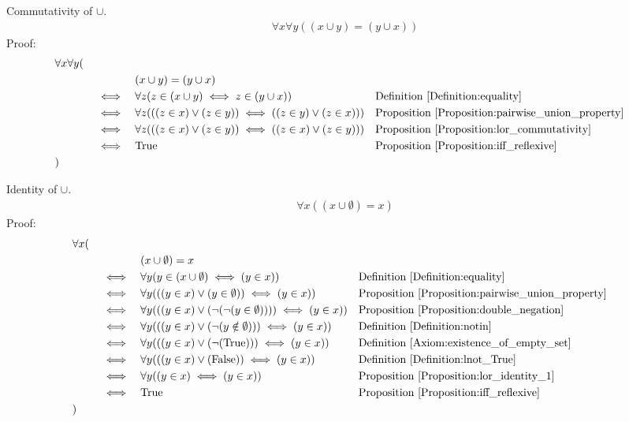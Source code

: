 \begin{prop}
\label{Proposition:union_commutativity}
Commutativity of $\cup$.
\begin{align*}
\forall x \forall y ((x \cup y) = (y \cup x))
\end{align*}
Proof:
\begin{align*}
& \forall x \forall y ( \\
& \quad && && (x \cup y) = (y \cup x) \\
& \quad && \iff && \forall z (z \in (x \cup y) \iff z \in (y \cup x))
&& \text{Definition \ref{Definition:equality}} \\
& \quad && \iff && \forall z( ((z \in x) \lor (z \in y)) \iff ((z \in y) \lor (z \in x)) )
&& \text{Proposition \ref{Proposition:pairwise_union_property}} \\
& \quad && \iff && \forall z( ((z \in x) \lor (z \in y)) \iff ((z \in x) \lor (z \in y)) )
&& \text{Proposition \ref{Proposition:lor_commutativity}} \\
& \quad && \iff && \text{True}
&& \text{Proposition \ref{Proposition:iff_reflexive}} \\
& )
\end{align*}
\end{prop}

\begin{prop}
\label{Proposition:union_identity}
Identity of $\cup$.
\begin{align*}
\forall x ((x \cup \emptyset) = x)
\end{align*}
Proof:
\begin{align*}
& \forall x ( \\
& \quad && && (x \cup \emptyset) = x \\
& \quad && \iff && \forall y(y \in (x \cup \emptyset) \iff (y \in x))
&& \text{Definition \ref{Definition:equality}} \\
& \quad && \iff && \forall y(((y \in x) \lor (y \in \emptyset)) \iff (y \in x))
&& \text{Proposition \ref{Proposition:pairwise_union_property}} \\
& \quad && \iff && \forall y(((y \in x) \lor ( \lnot (\lnot (y \in \emptyset))) ) \iff (y \in x))
&& \text{Proposition \ref{Proposition:double_negation}} \\
& \quad && \iff && \forall y(((y \in x) \lor ( \lnot (y \notin \emptyset))) \iff (y \in x))
&& \text{Definition \ref{Definition:notin}} \\
& \quad && \iff && \forall y(((y \in x) \lor ( \lnot (\text{True}))) \iff (y \in x))
&& \text{Definition \ref{Axiom:existence_of_empty_set}} \\
& \quad && \iff && \forall y(((y \in x) \lor (\text{False})) \iff (y \in x))
&& \text{Definition \ref{Definition:lnot_True}} \\
& \quad && \iff && \forall y((y \in x) \iff (y \in x))
&& \text{Proposition \ref{Proposition:lor_identity_1}} \\
& \quad && \iff && \text{True}
&& \text{Proposition \ref{Proposition:iff_reflexive}} \\
& )
\end{align*}
\end{prop}


